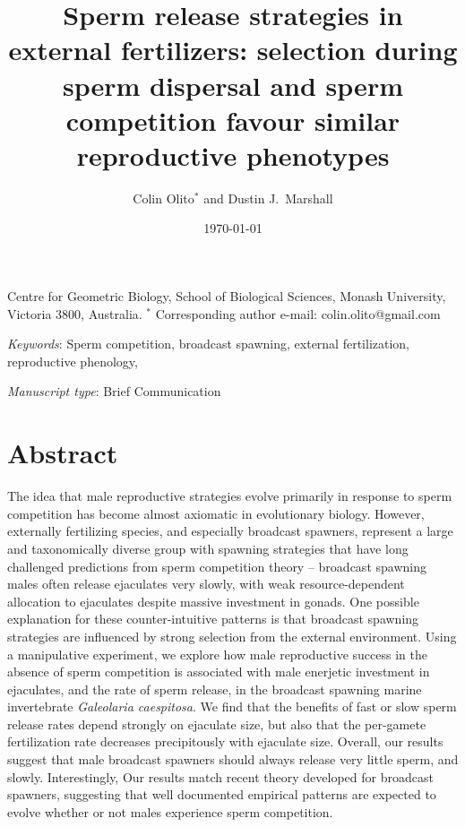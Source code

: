 \documentclass{article}
\title{Sperm release strategies in external fertilizers: selection during sperm dispersal and sperm competition favour similar reproductive phenotypes}
\author{Colin Olito$^{\ast}$ and Dustin J.~Marshall}
\date{\today}
\begin{document}
\maketitle


\noindent{} Centre for Geometric Biology, School of Biological Sciences, Monash University, Victoria 3800, Australia.
\noindent{} $^\ast$ Corresponding author e-mail: colin.olito@gmail.com

\bigskip

\noindent{} \textit{Keywords}: Sperm competition, broadcast spawning, external fertilization, reproductive phenology, 

\bigskip

\noindent{} \textit{Manuscript type}: Brief Communication

\bigskip


\linenumbers
\modulolinenumbers[1]
\renewcommand\linenumberfont{\normalfont\small}
\newpage{}


\section*{Abstract}

\noindent{} The idea that male reproductive strategies evolve primarily in response to sperm competition has become almost axiomatic in evolutionary biology. However, externally fertilizing species, and especially broadcast spawners, represent a large and taxonomically diverse group with spawning strategies that have long challenged predictions from sperm competition theory -- broadcast spawning males often release ejaculates very slowly, with weak resource-dependent allocation to ejaculates despite massive investment in gonads. One possible explanation for these counter-intuitive patterns is that broadcast spawning strategies are influenced by strong selection from the external environment. Using a manipulative experiment, we explore how male reproductive success in the absence of sperm competition is associated with male enerjetic investment in ejaculates, and the rate of sperm release, in the broadcast spawning marine invertebrate \textit{Galeolaria caespitosa}. We find that the benefits of fast or slow sperm release rates depend strongly on ejaculate size, but also that the per-gamete fertilization rate decreases precipitously with ejaculate size. Overall, our results suggest that male broadcast spawners should always release very little sperm, and slowly. Interestingly, Our results match recent theory developed for broadcast spawners, suggesting that well documented empirical patterns are expected to evolve whether or not males experience sperm competition.
\end{document}
